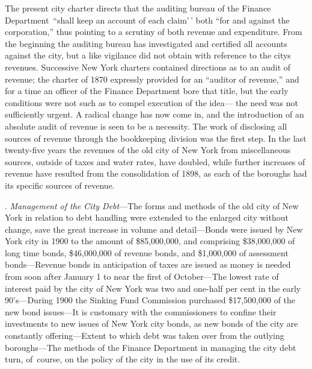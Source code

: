 \documentclass[openany,nobib]{tufte-book}
\begin{document}
The present city charter directs that the auditing bureau of the Finance
Department~``shall keep an account of each claim'\,' both ``for and
against the corporation,'' thus pointing to a scrutiny of both revenue
and expenditure. From the beginning the auditing bureau has investigated
and certified all accounts against the city, but a like vigilance did
not obtain with reference to the city\textquotesingle s revenues.
Successive New York charters contained directions as to an audit of
revenue; the charter of 1870 expressly provided for an ``auditor of
revenue,'' and for a time an officer of the Finance Department bore that
title, but the early conditions were not such as to compel execution of
the idea--- the need was not sufficiently urgent. A radical change has
now come in, and the introduction of an absolute audit of revenue is
seen to be a necessity. The work of disclosing all sources of revenue
through the bookkeeping division was the first step. In the last
twenty-five years the revenues of the old city of New York from
miscellaneous sources, outside of taxes and water rates, have doubled,
while further increases of revenue have resulted from the consolidation
of 1898, as each of the boroughs had its specific sources of revenue.~~

\vspace{.15in}

. \emph{Management of the City Debt}---The forms and methods of the old
city of New York in relation to debt handling were extended to the
enlarged city without change, save the great increase in volume and
detail---Bonds were issued by New York city in 1900 to the amount of
\$85,000,000, and comprising \$38,000,000 of long time bonds,
\$46,000,000 of revenue bonds, and \$1,000,000 of assessment
bonds---Revenue bonds in anticipation of taxes are issued as money is
needed from soon after January 1 to near the first of October---The
lowest rate of interest paid by the city of New York was two and
one-half per cent in the early 90's---During 1900 the Sinking Fund
Commission purchased \$17,500,000 of the new bond issues---It is
customary with the commissioners to confine their investments to new
issues of New York city bonds, as new bonds of the city are constantly
offering---Extent to which debt was taken over from the outlying
boroughs---The methods of the Finance Department in managing the city
debt turn, of~course, on the policy of the city in the use of its
credit.~~

\enlargethispage{\baselineskip}
\end{document}
